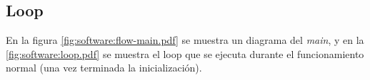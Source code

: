 \documentclass[main]{subfiles}
\begin{document}
\newpage
\subsection{Loop}
\label{sec:software-loop}

En la figura \ref{fig:software:flow-main.pdf} se muestra un diagrama del \textit{main}, y en la \ref{fig:software:loop.pdf} se muestra el loop que se ejecuta durante el funcionamiento normal (una vez terminada la inicializaci\'on).


\end{document}
